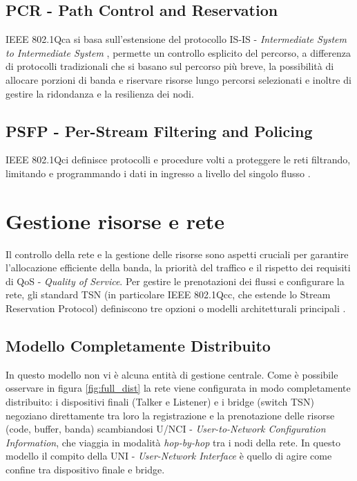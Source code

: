 \documentclass[12pt,a4paper,twoside]{book}
\begin{document}
\begin{onehalfspace}
\subsection{PCR - Path Control and Reservation}
IEEE 802.1Qca si basa sull'estensione del protocollo IS-IS - \textit{Intermediate System to Intermediate System} \cite{isis}, permette un controllo esplicito del percorso, a differenza di protocolli tradizionali che si basano sul percorso più breve, la possibilità di allocare porzioni di banda e riservare risorse lungo percorsi selezionati e inoltre di gestire la ridondanza e la resilienza dei nodi.
\subsection{PSFP - Per-Stream Filtering and Policing }
IEEE 802.1Qci definisce protocolli e procedure volti a proteggere le reti filtrando, limitando e programmando i dati in ingresso a livello del singolo flusso \cite{8021Qci}.
\section{Gestione risorse e rete}
Il controllo della rete e la gestione delle risorse sono aspetti cruciali per garantire l'allocazione efficiente della banda, la priorità del traffico e il rispetto dei requisiti di QoS - \textit{Quality of Service}.
Per gestire le prenotazioni dei flussi e configurare la rete, gli standard TSN (in particolare IEEE 802.1Qcc, che estende lo Stream Reservation Protocol) definiscono tre opzioni o modelli architetturali principali  \cite{architetture}.
\subsection{Modello Completamente Distribuito}
\label{subsec:modello_completamento_distribuito}


In questo modello non vi è alcuna entità di gestione centrale. Come è possibile osservare in figura \ref{fig:full_dist} la rete viene configurata in modo completamente distribuito: i dispositivi finali (Talker e Listener) e i bridge (switch TSN) negoziano direttamente tra loro la registrazione e la prenotazione delle risorse (code, buffer, banda) scambiandosi U/NCI - \textit{User-to-Network Configuration Information}, che viaggia in modalità \textit{hop-by-hop} tra i nodi della rete.
In questo modello il compito della UNI - \textit{User-Network Interface} è quello di agire come confine tra dispositivo finale e bridge.



\end{onehalfspace}
\end{document}
